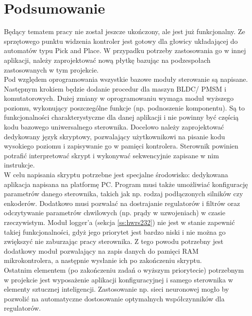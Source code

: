 \section*{Podsumowanie}

Będący tematem pracy \paperTitleSmallPl{} nie został jeszcze ukończony, ale jest już funkcjonalny. \linebreak Ze sprzętowego punktu widzenia kontroler jest gotowy dla głowicy układającej do automatów typu Pick and Place. W przypadku potrzeby zastosowania go w innej aplikacji, należy zaprojektować nową płytkę bazując na podzespołach zastosowanych w tym projekcie. \\

Pod względem oprogramowania wszystkie bazowe moduły sterowanie są napisane. Następnym krokiem będzie dodanie procedur dla maszyn BLDC/ PMSM \linebreak i komutatorowych. Dużej zmiany w oprogramowaniu wymaga moduł wyższego poziomu, wykonujący poszczególne funkcje (np. podnoszenie komponentu). Są to funkcjonalności charakterystyczne dla danej aplikacji i nie powinny być częścią kodu bazowego uniwersalnego sterownika. Docelowo należy zaprojektować dedykowany język skryptowy, pozwalający użytkownikowi na pisanie kodu wysokiego poziomu i zapisywanie go w pamięci kontrolera. Sterownik powinien potrafić interpretować skrypt i wykonywać sekwencyjnie zapisane w nim instrukcje. \\

W celu napisania skryptu potrzebne jest specjalne środowisko: dedykowana aplikacja napisana na platformę PC. Program musi także umożliwiać konfigurację parametrów danego sterownika, takich jak np. rodzaj podłączonych silników czy enkoderów. Dodatkowo musi pozwalać na dostrajanie regulatorów i filtrów oraz odczytywanie parametrów chwilowych (np. prądy w uzwojeniach) w czasie rzeczywistym. Moduł logger'a (sekcja \ref{ss:hwrs232}) nie jest w stanie zapewnić takiej funkcjonalności, gdyż jego priorytet jest bardzo niski i nie można go zwiększyć nie zaburzając pracy sterownika. Z tego powodu potrzebny jest dodatkowy moduł pozwalający na zapis danych do pamięci RAM mikrokontrolera, a następnie wysłanie ich po zakończeniu skryptu. \\

Ostatnim elementem (po zakończeniu zadań o wyższym priorytecie) potrzebnym w projekcie jest wyposażenie aplikacji konfiguracyjnej i samego sterownika w elementy sztucznej inteligencji. Zastosowanie np. sieci neuronowej mogło by pozwolić na automatyczne dostosowanie optymalnych współczynników dla regulatorów.


\clearpage





